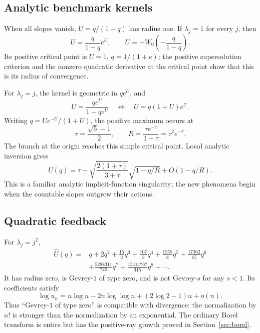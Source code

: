 \documentclass[11pt,a4paper]{article}
\numberwithin{equation}{section}
\theoremstyle{definition}
\theoremstyle{remark}
\newcommand{\Uhat}{\widehat U}
\begin{document}
\subsection{Analytic benchmark kernels}

When all slopes vanish, $U=q/(1-q)$ has radius one.  If $\lambda_j=1$
for every $j$, then
\[
 U=\frac{q}{1-q}e^U,
 \qquad U=-W_0\!\left(-\frac q{1-q}\right).
\]
Its positive critical point is $U=1$, $q=1/(1+e)$; the positive
supersolution criterion and the nonzero quadratic derivative at the
critical point show that this is its radius of convergence.

For $\lambda_j=j$, the kernel is geometric in $qe^U$, and
\begin{equation}
 U=\frac{qe^U}{1-qe^U}
 \quad\Longleftrightarrow\quad U=q(1+U)e^U.
 \label{eq:linearbenchmark}
\end{equation}
Writing $q=Ue^{-U}/(1+U)$, the positive maximum occurs at
\[
 \tau=\frac{\sqrt5-1}{2},\qquad
 R=\frac{\tau e^{-\tau}}{1+\tau}=\tau^2e^{-\tau}.
\]
The branch at the origin reaches this simple critical point.  Local
analytic inversion gives
\begin{equation}
 U(q)=\tau-
 \sqrt{\frac{2(1+\tau)}{3+\tau}}\sqrt{1-q/R}
 +O(1-q/R).
 \label{eq:linearsqrt}
\end{equation}
This is a familiar analytic implicit-function singularity; the new
phenomena begin when the countable slopes outgrow their actions.

\subsection{Quadratic feedback}
For $\lambda_j=j^2$,
\begin{align*}
 \Uhat(q)={}&q+2q^2+\frac{15}{2}q^3+\frac{107}{3}q^4
 +\frac{1555}{8}q^5+\frac{17362}{15}q^6\\
 &+\frac{5288311}{720}q^7+\frac{15414767}{315}q^8+\cdots.
\end{align*}
It has radius zero, is Gevrey-$1$ of type zero, and is not Gevrey-$s$
for any $s<1$.  Its coefficients satisfy
\begin{equation}
 \log u_n=n\log n-2n\log\log n+(2\log2-1)n+o(n).
 \label{eq:quadraticasymptotic}
\end{equation}
Thus ``Gevrey-$1$ of type zero'' is compatible with divergence: the
normalization by $n!$ is stronger than the normalization by an exponential.
The ordinary Borel transform is entire but has the positive-ray growth
proved in Section~\ref{sec:borel}.
\end{document}
